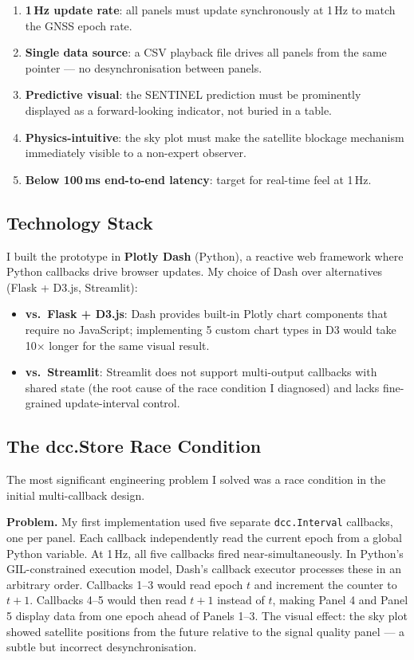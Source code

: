 \documentclass[12pt,a4paper]{article}
\newcommand{\code}[1]{\texttt{#1}}
\begin{document}
\begin{enumerate}
  \item \textbf{1\,Hz update rate}: all panels must update synchronously at 1\,Hz
    to match the GNSS epoch rate.
  \item \textbf{Single data source}: a CSV playback file drives all panels from the
    same pointer --- no desynchronisation between panels.
  \item \textbf{Predictive visual}: the SENTINEL prediction must be prominently
    displayed as a forward-looking indicator, not buried in a table.
  \item \textbf{Physics-intuitive}: the sky plot must make the satellite blockage
    mechanism immediately visible to a non-expert observer.
  \item \textbf{Below 100\,ms end-to-end latency}: target for real-time feel at 1\,Hz.
\end{enumerate}

\subsection{Technology Stack}

I built the prototype in \textbf{Plotly Dash} (Python), a reactive web framework where
Python callbacks drive browser updates.
My choice of Dash over alternatives (Flask + D3.js, Streamlit):

\begin{itemize}
  \item \textbf{vs.\ Flask + D3.js}: Dash provides built-in Plotly chart components
    that require no JavaScript; implementing 5 custom chart types in D3 would take
    10$\times$ longer for the same visual result.
  \item \textbf{vs.\ Streamlit}: Streamlit does not support multi-output callbacks with
    shared state (the root cause of the race condition I diagnosed) and lacks
    fine-grained update-interval control.
\end{itemize}

\subsection{The dcc.Store Race Condition}

The most significant engineering problem I solved was a race condition in the initial
multi-callback design.

\textbf{Problem.}
My first implementation used five separate \code{dcc.Interval} callbacks, one per panel.
Each callback independently read the current epoch from a global Python variable.
At 1\,Hz, all five callbacks fired near-simultaneously.
In Python's GIL-constrained execution model, Dash's callback executor processes these
in an arbitrary order.
Callbacks 1--3 would read epoch $t$ and increment the counter to $t+1$.
Callbacks 4--5 would then read $t+1$ instead of $t$, making Panel 4 and Panel 5 display
data from one epoch ahead of Panels 1--3.
The visual effect: the sky plot showed satellite positions from the future relative to
the signal quality panel --- a subtle but incorrect desynchronisation.
\end{document}
